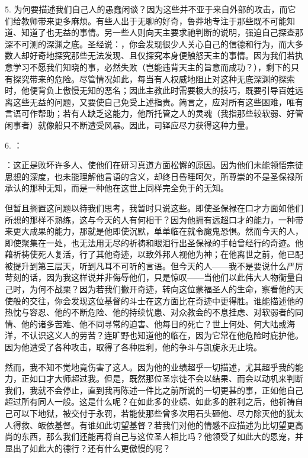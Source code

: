 5. 为何要描述我们自己人的愚蠢闲谈？因为这些并不亚于来自外部的攻击，而它们给教师带来更多麻烦。有些人出于无聊的好奇，鲁莽地专注于那些既不可能知道、知道了也无益的事情。另一些人则向天主要求祂判断的说明，强迫自己探查那深不可测的深渊之底。圣经说：，你会发现很少人关心自己的信德和行为，而大多数人却好奇地探究那些无法发现、且仅探究本身便触怒天主的事情。因为我们若执意学习不愿我们知晓的事，必然失败（岂能违背天主的旨意而成功？），剩下的只有探究带来的危险。尽管情况如此，每当有人权威地阻止对这种无底深渊的探索时，他便背负上傲慢无知的恶名；因此主教此时需要极大的技巧，既要引导百姓远离这些无益的问题，又要使自己免受上述指责。简言之，应对所有这些困难，唯有言语可作帮助；若有人缺乏这能力，他所托管之人的灵魂（我指那些较软弱、好管闲事者）就像船只不断遭受风暴。因此，司铎应尽力获得这种力量。\par

6. ：\par

：这正是败坏许多人、使他们在研习真道方面松懈的原因。因为他们未能领悟宗徒思想的深度，也未能理解他言语的含义，却终日昏睡呵欠，所尊崇的不是圣保禄所承认的那种无知，而是一种他在这世上同样完全免于的无知。\par

但暂且搁置这问题以待我们思考，我暂时只说这些。即使圣保禄在口才方面如他们所想的那样不熟练，这与今天的人有何相干？因为他拥有远超口才的能力，一种带来更大成果的能力，那就是他即使沉默，单单临在就令魔鬼恐惧。然而今天的人，即使聚集在一处，也无法用无尽的祈祷和眼泪行出圣保禄的手帕曾经行的奇迹。他藉祈祷使死人复活，行了其他奇迹，以致外邦人视他为神；在他离世之前，他已配被提升到第三层天，听到凡耳不可听的言语。但今天的人——我不是要说什么严厉苛刻的话，因为我这样说并非侮辱他们，只是惊叹——当他们以此伟大人物衡量自己时，为何不战栗？因为若我们撇开奇迹，转向这位蒙福圣人的生命，察看他的天使般的交往，你会发现这位基督的斗士在这方面比在奇迹中更得胜。谁能描述他的热忱与容忍、他的不断危险、他的持续忧患、对众教会的不息挂虑、对软弱者的同情、他的诸多苦难、他不同寻常的迫害、他每日的死亡？世上何处、何大陆或海洋，不认识这义人的劳苦？连旷野也知道他的临在，因为它常在他危险时庇护他。因为他遭受了各种攻击，取得了各种胜利，他的争斗与凯旋永无止境。\par

然而，我不知不觉地竟伤害了这人。因为他的业绩超乎一切描述，尤其超乎我的能力，正如口才大师超过我。但是，既然那位圣宗徒不会以结果、而会以动机来判断我们，我就不会停止，直到我再陈述一件比之前所说的一切更甚的事，正如他自己超过所有同人一般。这是什么呢？在如此多的业绩、如此多的胜利之后，他祈祷自己可以下地狱，被交付于永罚，若能使那些曾多次用石头砸他、尽力除灭他的犹太人得救、皈依基督。有谁如此切望基督？若我们对他的情感不应描述为比切望更高尚的东西，那么我们还能再将自己与这位圣人相比吗？他领受了如此大的恩宠，并显出了如此大的德行？还有什么更傲慢的呢？\par

